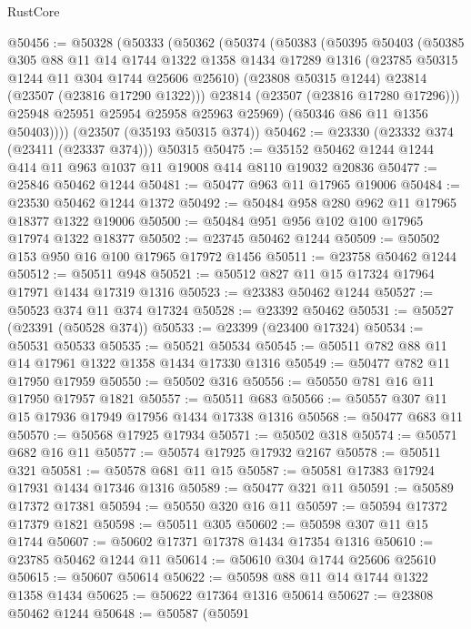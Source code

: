\begin{lexlean}{RustCore}
\begin{coremodule}
@50456 := @50328
    (@50333
      (@50362
        (@50374
          (@50383
            (@50395
              @50403
              (@50385
                @305
                @88
                @11
                @14
                @1744
                @1322
                @1358
                @1434
                @17289
                @1316
                (@23785 @50315 @1244 @11 @304 @1744 @25606 @25610)
                (@23808 @50315 @1244)
                @23814
                (@23507 (@23816 @17290 @1322)))
              @23814
              (@23507 (@23816 @17280 @17296)))
            @25948
            @25951
            @25954
            @25958
            @25963
            @25969)
          (@50346 @86 @11 @1356 @50403))))
    (@23507 (@35193 @50315 @374))
@50462 := @23330 (@23332 @374 (@23411 (@23337 @374))) @50315
@50475 := @35152 @50462 @1244 @1244 @414 @11 @963 @1037 @11 @19008 @414 @8110 @19032 @20836
@50477 := @25846 @50462 @1244
@50481 := @50477 @963 @11 @17965 @19006
@50484 := @23530 @50462 @1244 @1372
@50492 := @50484 @958 @280 @962 @11 @17965 @18377 @1322 @19006
@50500 := @50484 @951 @956 @102 @100 @17965 @17974 @1322 @18377
@50502 := @23745 @50462 @1244
@50509 := @50502 @153 @950 @16 @100 @17965 @17972 @1456
@50511 := @23758 @50462 @1244
@50512 := @50511 @948
@50521 := @50512 @827 @11 @15 @17324 @17964 @17971 @1434 @17319 @1316
@50523 := @23383 @50462 @1244
@50527 := @50523 @374 @11 @374 @17324
@50528 := @23392 @50462
@50531 := @50527 (@23391 (@50528 @374))
@50533 := @23399 (@23400 @17324)
@50534 := @50531 @50533
@50535 := @50521 @50534
@50545 := @50511 @782 @88 @11 @14 @17961 @1322 @1358 @1434 @17330 @1316
@50549 := @50477 @782 @11 @17950 @17959
@50550 := @50502 @316
@50556 := @50550 @781 @16 @11 @17950 @17957 @1821
@50557 := @50511 @683
@50566 := @50557 @307 @11 @15 @17936 @17949 @17956 @1434 @17338 @1316
@50568 := @50477 @683 @11
@50570 := @50568 @17925 @17934
@50571 := @50502 @318
@50574 := @50571 @682 @16 @11
@50577 := @50574 @17925 @17932 @2167
@50578 := @50511 @321
@50581 := @50578 @681 @11 @15
@50587 := @50581 @17383 @17924 @17931 @1434 @17346 @1316
@50589 := @50477 @321 @11
@50591 := @50589 @17372 @17381
@50594 := @50550 @320 @16 @11
@50597 := @50594 @17372 @17379 @1821
@50598 := @50511 @305
@50602 := @50598 @307 @11 @15 @1744
@50607 := @50602 @17371 @17378 @1434 @17354 @1316
@50610 := @23785 @50462 @1244 @11
@50614 := @50610 @304 @1744 @25606 @25610
@50615 := @50607 @50614
@50622 := @50598 @88 @11 @14 @1744 @1322 @1358 @1434
@50625 := @50622 @17364 @1316 @50614
@50627 := @23808 @50462 @1244
@50648 := @50587
    (@50591

\end{coremodule}
\end{lexlean}
